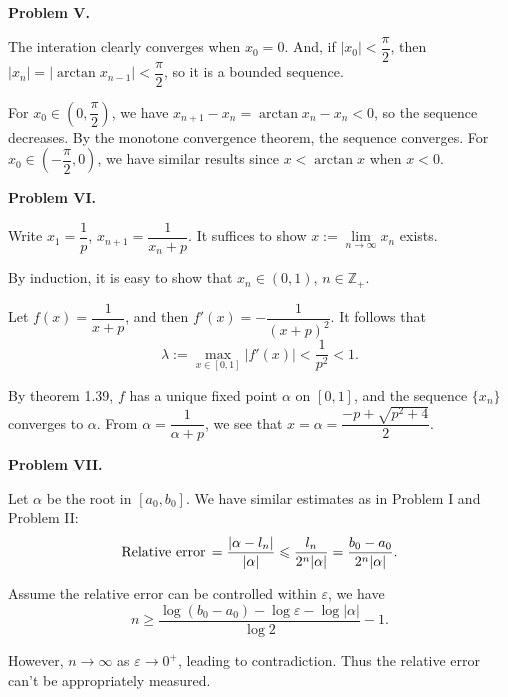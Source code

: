 \documentclass[UTF8]{ctexart}
\begin{document}
\quad

\textbf{Problem V.}

The interation clearly converges when $x_0=0$. And, if $|x_0|<\dfrac\pi2$, then $|x_n|=|\arctan x_{n-1}|<\dfrac\pi2$, so it is a bounded sequence.

For $x_0\in\left(0,\dfrac\pi2\right)$, we have $x_{n+1}-x_n=\arctan x_n-x_n<0$, so the sequence decreases. By the monotone convergence theorem, the sequence converges. For $x_0\in\left(-\dfrac\pi2,0\right)$, we have similar results since $x<\arctan x$ when $x<0$.

\quad

\textbf{Problem VI.}

Write $x_1=\dfrac1p$, $x_{n+1}=\dfrac{1}{x_n+p}$. It suffices to show $x:=\lim\limits_{n\to\infty} x_n$ exists. 

By induction, it is easy to show that $x_n\in(0,1)$, $n\in\mathbb{Z}_+$.

Let $f(x)=\dfrac{1}{x+p}$, and then $f'(x)=-\dfrac{1}{(x+p)^2}$. It follows that
\[\lambda:=\max\limits_{x\in[0,1]}|f'(x)|<\dfrac{1}{p^2}<1.\]

By theorem 1.39, $f$ has a unique fixed point $\alpha$ on $[0,1]$, and the sequence $\{x_n\}$ converges to $\alpha$. From $\alpha=\dfrac{1}{\alpha+p}$, we see that $x=\alpha=\dfrac{-p+\sqrt{p^2+4}}{2}$.

\newpage

\textbf{Problem VII.}

Let $\alpha$ be the root in $[a_0,b_0]$. We have similar estimates as in Problem I and Problem II:
\[\text{Relative error\,}=\dfrac{|\alpha-l_n|}{|\alpha|}\leqslant\dfrac{l_n}{2^n|\alpha|}=\dfrac{b_0-a_0}{2^n|\alpha|}.\]

Assume the relative error can be controlled within $\varepsilon$, we have
\[n\geqslant\dfrac{\log(b_0-a_0)-\log\varepsilon-\log|\alpha|}{\log 2}-1.\]

However, $n\to\infty$ as $\varepsilon\to0^+$, leading to contradiction. Thus the relative error can't be appropriately measured.
\end{document}
